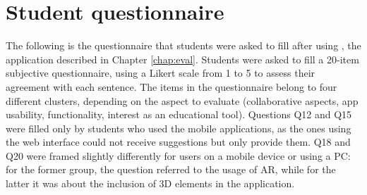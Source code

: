 \label{tab:teachersurv}



\chapter{Student questionnaire}
The following is the questionnaire that students were asked to fill after using \appname{}, the application described in Chapter \ref{chap:eval}. Students were asked to fill a 20-item subjective questionnaire, using a Likert scale from 1 to 5 to assess their agreement with each sentence. The items in the questionnaire belong to four different clusters, depending on the aspect to evaluate (collaborative aspects, app usability, functionality, interest as an educational tool). Questions Q12 and Q15 were filled only by students who used the mobile applications, as the ones using the web interface could not receive suggestions but only provide them. Q18 and Q20 were framed slightly differently for users on a mobile device or using a PC: for the former group, the question referred to the usage of AR, while for the latter it was about the inclusion of 3D elements in the application. 


